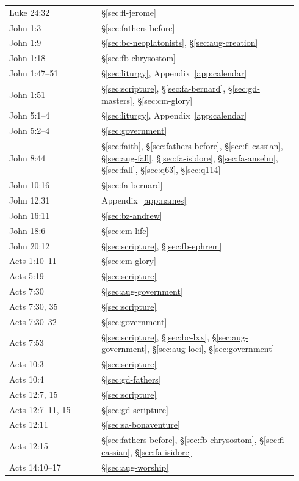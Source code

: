 \begin{longtable}{>{\raggedright\arraybackslash}p{0.30\linewidth}>{\raggedright\arraybackslash}p{0.64\linewidth}}
Luke 24:32 & \S\ref{sec:fl-jerome}\\
John 1:3 & \S\ref{sec:fathers-before}\\
John 1:9 & \S\ref{sec:bc-neoplatonists}, \S\ref{sec:aug-creation}\\
John 1:18 & \S\ref{sec:fb-chrysostom}\\
John 1:47--51 & \S\ref{sec:liturgy}, Appendix~\ref{app:calendar}\\
John 1:51 & \S\ref{sec:scripture}, \S\ref{sec:fa-bernard}, \S\ref{sec:gd-masters}, \S\ref{sec:cm-glory}\\
John 5:1--4 & \S\ref{sec:liturgy}, Appendix~\ref{app:calendar}\\
John 5:2--4 & \S\ref{sec:government}\\
John 8:44 & \S\ref{sec:faith}, \S\ref{sec:fathers-before}, \S\ref{sec:fl-cassian}, \S\ref{sec:aug-fall}, \S\ref{sec:fa-isidore}, \S\ref{sec:fa-anselm}, \S\ref{sec:fall}, \S\ref{sec:q63}, \S\ref{sec:q114}\\
John 10:16 & \S\ref{sec:fa-bernard}\\
John 12:31 & Appendix~\ref{app:names}\\
John 16:11 & \S\ref{sec:bz-andrew}\\
John 18:6 & \S\ref{sec:cm-life}\\
John 20:12 & \S\ref{sec:scripture}, \S\ref{sec:fb-ephrem}\\
Acts 1:10--11 & \S\ref{sec:cm-glory}\\
Acts 5:19 & \S\ref{sec:scripture}\\
Acts 7:30 & \S\ref{sec:aug-government}\\
Acts 7:30, 35 & \S\ref{sec:scripture}\\
Acts 7:30--32 & \S\ref{sec:government}\\
Acts 7:53 & \S\ref{sec:scripture}, \S\ref{sec:bc-lxx}, \S\ref{sec:aug-government}, \S\ref{sec:aug-loci}, \S\ref{sec:government}\\
Acts 10:3 & \S\ref{sec:scripture}\\
Acts 10:4 & \S\ref{sec:gd-fathers}\\
Acts 12:7, 15 & \S\ref{sec:scripture}\\
Acts 12:7--11, 15 & \S\ref{sec:gd-scripture}\\
Acts 12:11 & \S\ref{sec:sa-bonaventure}\\
Acts 12:15 & \S\ref{sec:fathers-before}, \S\ref{sec:fb-chrysostom}, \S\ref{sec:fl-cassian}, \S\ref{sec:fa-isidore}\\
Acts 14:10--17 & \S\ref{sec:aug-worship}\\

\end{longtable}
